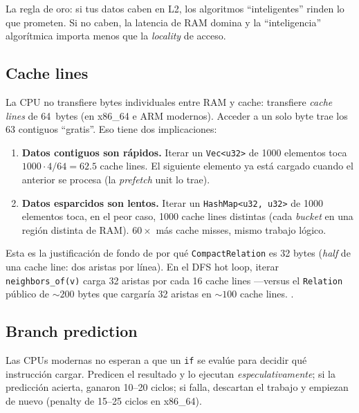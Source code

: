 \noindent
La regla de oro: si tus datos caben en L2, los algoritmos
``inteligentes'' rinden lo que prometen. Si no caben, la latencia de
RAM domina y la ``inteligencia'' algorítmica importa menos que la
\emph{locality} de acceso.

\subsection{Cache lines}

La CPU no transfiere bytes individuales entre RAM y cache: transfiere
\emph{cache lines} de 64~bytes (en x86\_64 e ARM modernos). Acceder a
un solo byte trae los 63 contiguos ``gratis''. Eso tiene dos
implicaciones:

\begin{enumerate}
    \item \textbf{Datos contiguos son rápidos.} Iterar un
    \texttt{Vec<u32>} de 1000 elementos toca \(1000 \cdot 4 / 64 =
    62.5\) cache lines. El siguiente elemento ya está cargado cuando
    el anterior se procesa (la \emph{prefetch} unit lo trae).
    \item \textbf{Datos esparcidos son lentos.} Iterar un
    \texttt{HashMap<u32, u32>} de 1000 elementos toca, en el peor
    caso, 1000 cache lines distintas (cada \emph{bucket} en una
    región distinta de RAM). \(60\times\) más cache misses, mismo
    trabajo lógico.
\end{enumerate}

\begin{enelcodigo}
Esta es la justificación de fondo de por qué
\texttt{CompactRelation} es 32 bytes (\emph{half} de una cache line:
dos aristas por línea). En el DFS hot loop, iterar
\texttt{neighbors\_of(v)} carga 32 aristas por cada 16 cache lines
---versus el \texttt{Relation} público de \(\sim 200\) bytes que
cargaría 32 aristas en \(\sim 100\) cache lines.
.
\end{enelcodigo}

\subsection{Branch prediction}

Las CPUs modernas no esperan a que un \texttt{if} se evalúe para
decidir qué instrucción cargar. Predicen el resultado y lo ejecutan
\emph{especulativamente}; si la predicción acierta, ganaron 10--20
ciclos; si falla, descartan el trabajo y empiezan de nuevo (penalty
de 15--25 ciclos en x86\_64).

